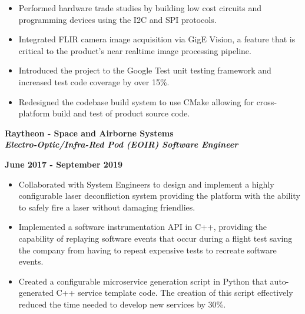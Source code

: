 \documentclass[10pt,letterpaper]{article}
\begin{document}
\begin{itemize}[noitemsep,topsep=0pt]
    \setlength\itemsep{0.1em}
    \item Performed hardware trade studies by building low cost circuits
          and programming devices using the I2C and SPI protocols.
    \item Integrated FLIR camera image acquisition via GigE Vision, a feature
          that is  critical to the product's near realtime image processing
          pipeline.
    \item Introduced the project to the Google Test unit testing framework and
          increased test code coverage by over 15\%.
    \item Redesigned the codebase build system to use CMake allowing for
          cross-platform build and test of product source code.
\end{itemize}

\medskip

\begin{minipage}[t]{0.53\textwidth}
    \begin{flushleft}
        \textbf{Raytheon - Space and Airborne Systems}\\
        \textbf{\textit{Electro-Optic/Infra-Red Pod (EOIR) Software Engineer}}\\
    \end{flushleft}
\end{minipage}
\begin{minipage}[t]{0.44\textwidth}
    \begin{flushright}
        \textbf{June 2017 - September 2019}
    \end{flushright}
\end{minipage}

\begin{itemize}[noitemsep,topsep=0pt]
    \setlength\itemsep{0.1em}
    \item Collaborated with System Engineers to design and implement a highly
          configurable laser deconfliction system providing the platform with
          the ability to safely fire a laser without damaging friendlies.
    \item Implemented a software instrumentation API in C++, providing the
          capability of replaying software events that occur during a flight
          test saving the company from having to repeat expensive tests to
          recreate software events.
    \item Created a configurable microservice generation script in Python that
          auto-generated C++ service template code. The creation of this script
          effectively reduced the time needed to develop new services by 30\%.
\end{itemize}
\end{document}
